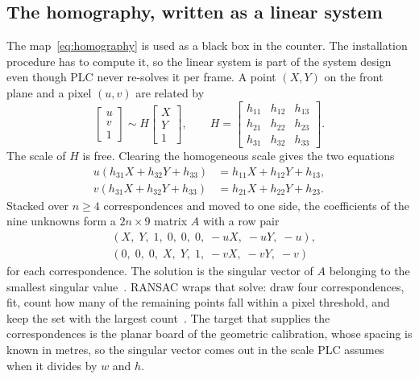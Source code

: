 \subsection{The homography, written as a linear system}
\label{sec:dlt}

The map~\eqref{eq:homography} is used as a black box in the counter. The installation procedure has to compute it, so the linear system is part of the system design even though PLC never re-solves it per frame. A point $(X,Y)$ on the front plane and a pixel $(u,v)$ are related by
\begin{equation}
\begin{bmatrix} u \\ v \\ 1 \end{bmatrix}
\sim
H
\begin{bmatrix} X \\ Y \\ 1 \end{bmatrix},
\qquad
H=
\begin{bmatrix}
h_{11} & h_{12} & h_{13} \\
h_{21} & h_{22} & h_{23} \\
h_{31} & h_{32} & h_{33}
\end{bmatrix}.
\label{eq:H}
\end{equation}
The scale of $H$ is free. Clearing the homogeneous scale gives the two equations
\begin{equation}
\begin{aligned}
u(h_{31}X+h_{32}Y+h_{33}) &= h_{11}X+h_{12}Y+h_{13},\\
v(h_{31}X+h_{32}Y+h_{33}) &= h_{21}X+h_{22}Y+h_{23}.
\end{aligned}
\label{eq:dlt-pair}
\end{equation}
Stacked over $n\ge 4$ correspondences and moved to one side, the coefficients of the nine unknowns form a $2n\times 9$ matrix $A$ with a row pair
\begin{equation}
\begin{aligned}
&(X,\; Y,\; 1,\; 0,\; 0,\; 0,\; -uX,\; -uY,\; -u),\\
&(0,\; 0,\; 0,\; X,\; Y,\; 1,\; -vX,\; -vY,\; -v)
\end{aligned}
\label{eq:dlt-rows}
\end{equation}
for each correspondence. The solution is the singular vector of $A$ belonging to the smallest singular value~\cite{hartley2004mvg}. RANSAC wraps that solve: draw four correspondences, fit, count how many of the remaining points fall within a pixel threshold, and keep the set with the largest count~\cite{fischler1981ransac}. The target that supplies the correspondences is the planar board of the geometric calibration, whose spacing is known in metres, so the singular vector comes out in the scale PLC assumes when it divides by $w$ and $h$.

